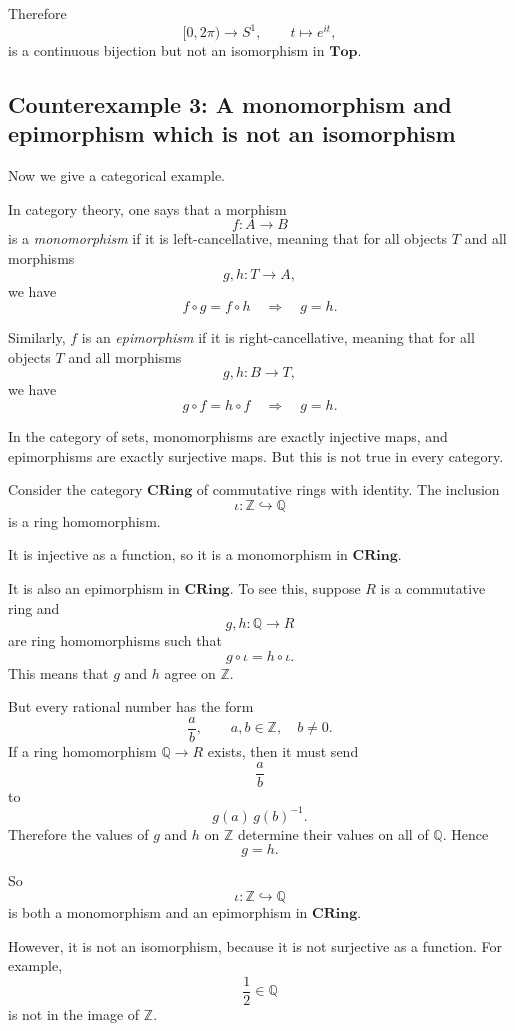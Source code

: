 \documentclass[12pt,a4paper]{article}
\theoremstyle{notespace}
\begin{document}
Therefore
\[
[0,2\pi)\to S^1,
\qquad
t\mapsto e^{it},
\]
is a continuous bijection but not an isomorphism in \(\mathbf{Top}\).

\subsection{Counterexample 3: A monomorphism and epimorphism which is not an isomorphism}

Now we give a categorical example.

In category theory, one says that a morphism
\[
f:A\to B
\]
is a \emph{monomorphism} if it is left-cancellative, meaning that for all objects \(T\) and all morphisms
\[
g,h:T\to A,
\]
we have
\[
f\circ g=f\circ h
\quad\Longrightarrow\quad
g=h.
\]

Similarly, \(f\) is an \emph{epimorphism} if it is right-cancellative, meaning that for all objects \(T\) and all morphisms
\[
g,h:B\to T,
\]
we have
\[
g\circ f=h\circ f
\quad\Longrightarrow\quad
g=h.
\]

In the category of sets, monomorphisms are exactly injective maps, and epimorphisms are exactly surjective maps. But this is not true in every category.

Consider the category \(\mathbf{CRing}\) of commutative rings with identity. The inclusion
\[
\iota:\mathbb Z\hookrightarrow \mathbb Q
\]
is a ring homomorphism.

It is injective as a function, so it is a monomorphism in \(\mathbf{CRing}\).

It is also an epimorphism in \(\mathbf{CRing}\). To see this, suppose \(R\) is a commutative ring and
\[
g,h:\mathbb Q\to R
\]
are ring homomorphisms such that
\[
g\circ \iota=h\circ \iota.
\]
This means that \(g\) and \(h\) agree on \(\mathbb Z\).

But every rational number has the form
\[
\frac{a}{b},
\qquad
a,b\in \mathbb Z,\quad b\neq 0.
\]
If a ring homomorphism \(\mathbb Q\to R\) exists, then it must send
\[
\frac{a}{b}
\]
to
\[
g(a)\,g(b)^{-1}.
\]
Therefore the values of \(g\) and \(h\) on \(\mathbb Z\) determine their values on all of \(\mathbb Q\). Hence
\[
g=h.
\]

So
\[
\iota:\mathbb Z\hookrightarrow \mathbb Q
\]
is both a monomorphism and an epimorphism in \(\mathbf{CRing}\).

However, it is not an isomorphism, because it is not surjective as a function. For example,
\[
\frac{1}{2}\in \mathbb Q
\]
is not in the image of \(\mathbb Z\).
\end{document}
